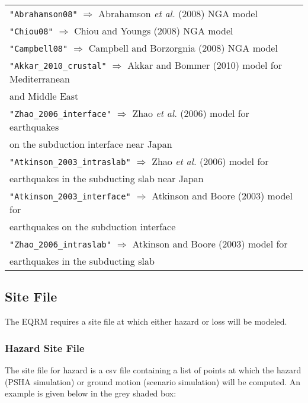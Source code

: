 \begin{tabular}{|p{\textwidth}|}
\texttt{"Abrahamson08"} $\Rightarrow$ Abrahamson \textit{et al.} (2008) NGA model\\
\texttt{"Chiou08"} $\Rightarrow$ Chiou and Youngs (2008) NGA model \\
\texttt{"Campbell08"} $\Rightarrow$ Campbell and Borzorgnia (2008) NGA model \\
\texttt{"Akkar\_2010\_crustal"} $\Rightarrow$ Akkar and Bommer (2010) model for Mediterranean \\
\hspace{8em} and Middle East\\
\texttt{"Zhao\_2006\_interface"} $\Rightarrow$ Zhao \textit{et al.} (2006) model for earthquakes \\
\hspace{8em} on the subduction interface near Japan \\
\texttt{"Atkinson\_2003\_intraslab"} $\Rightarrow$ Zhao \textit{et al.} (2006) model for \\
\hspace{8em} earthquakes in the subducting slab near Japan\\
\texttt{"Atkinson\_2003\_interface"} $\Rightarrow$ Atkinson and Boore (2003) model for \\
\hspace{8em} earthquakes on the subduction interface\\
\texttt{"Zhao\_2006\_intraslab"} $\Rightarrow$ Atkinson and Boore (2003) model for \\
\hspace{8em} earthquakes in the subducting slab \\
\hline
\end{tabular}



\subsection{Site File}


The EQRM requires a site file at which either hazard or loss will be modeled.

\subsubsection{Hazard Site File}

The site file for hazard is a csv file containing a list of points at which the hazard (PSHA simulation)
 or ground motion (scenario simulation) will be computed. An example is
 given below in the grey shaded box:


